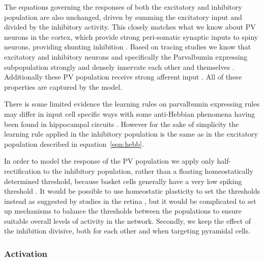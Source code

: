 The equations governing the responses of both the excitatory and
inhibitory population are also unchanged, driven by summing the
excitatory input and divided by the inhibitory activity. This closely
matches what we know about PV neurons in the cortex, which provide
strong peri-somatic synaptic inputs to spiny neurons, providing
shunting inhibition \citep{Atallah2012, Wilson2012}. Based on tracing
studies we know that excitatory and inhibitory neurons and
specifically the Parvalbumin expressing subpopulation strongly and
densely innervate each other and themselves \citep{Buzas2001, Ma2011,
  Pfeffer2013}. Additionally these PV population receive strong
afferent input \citep{Burkhalter2008}. All of these properties are
captured by the model.

There is some limited evidence the learning rules on parvalbumin
expressing rules may differ in input cell specific ways with some
anti-Hebbian phenomena having been found in hippocampal circuits
\citep{LeRoux2013}. However for the sake of simplicity the learning
rule applied in the inhibitory population is the same as in the
excitatory population described in equation~\ref{eqn:hebb}.

In order to model the response of the PV population we apply only
half-rectification to the inhibitory population, rather than a
floating homeostatically determined threshold, because basket cells
generally have a very low spiking threshold \citep{Ma2011}.  It would
be possible to use homeostatic plasticity to set the thresholds
instead as suggested by studies in the retina \citep{Hennig2011}, but
it would be complicated to set up mechanisms to balance the thresholds
between the populations to ensure suitable overall levels of activity
in the network. Secondly, we keep the effect of the inhibition
divisive, both for each other and when targeting pyramidal cells.

\subsubsection*{Activation}

